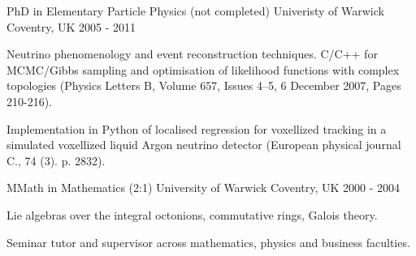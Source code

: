 

\begin{cventries}

  \cventry
    {PhD in Elementary Particle Physics (not completed)}
    {Univeristy of Warwick}
    {Coventry, UK}
    {2005 - 2011}
    { 
    \begin{cvitems}
      \item {Neutrino phenomenology and event reconstruction techniques. C/C++ for MCMC/Gibbs sampling and optimisation of likelihood functions with complex topologies (Physics Letters B, Volume 657, Issues 4–5, 6 December 2007, Pages 210-216).}
      \item {Implementation in Python of localised regression for voxellized tracking in a simulated voxellized liquid Argon neutrino detector (European physical journal C., 74 (3). p. 2832).}
    \end{cvitems}
    }
  \cventry
    {MMath in Mathematics (2:1)} %
    {University of Warwick} %
    {Coventry, UK} %
    {2000 - 2004} %
    {
      \begin{cvitems} %
        \item {Lie algebras over the integral octonions, commutative rings, Galois theory.}
        \item {Seminar tutor and supervisor across mathematics, physics and business faculties.}
      \end{cvitems}
    }

\end{cventries}
